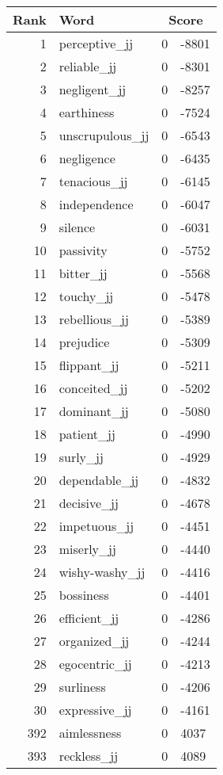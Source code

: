 \begin{longtable}[!htbp]{| rlr@{.}l |}
    \hline
    \textbf{Rank} & \textbf{Word} & \multicolumn{2}{c|}{\textbf{Score}} \\
    \hline
    \endhead
    1 & perceptive\_jj & 0 & -8801 \\
    2 & reliable\_jj & 0 & -8301 \\
    3 & negligent\_jj & 0 & -8257 \\
    4 & earthiness & 0 & -7524 \\
    5 & unscrupulous\_jj & 0 & -6543 \\
    6 & negligence & 0 & -6435 \\
    7 & tenacious\_jj & 0 & -6145 \\
    8 & independence & 0 & -6047 \\
    9 & silence & 0 & -6031 \\
    10 & passivity & 0 & -5752 \\
    11 & bitter\_jj & 0 & -5568 \\
    12 & touchy\_jj & 0 & -5478 \\
    13 & rebellious\_jj & 0 & -5389 \\
    14 & prejudice & 0 & -5309 \\
    15 & flippant\_jj & 0 & -5211 \\
    16 & conceited\_jj & 0 & -5202 \\
    17 & dominant\_jj & 0 & -5080 \\
    18 & patient\_jj & 0 & -4990 \\
    19 & surly\_jj & 0 & -4929 \\
    20 & dependable\_jj & 0 & -4832 \\
    21 & decisive\_jj & 0 & -4678 \\
    22 & impetuous\_jj & 0 & -4451 \\
    23 & miserly\_jj & 0 & -4440 \\
    24 & wishy-washy\_jj & 0 & -4416 \\
    25 & bossiness & 0 & -4401 \\
    26 & efficient\_jj & 0 & -4286 \\
    27 & organized\_jj & 0 & -4244 \\
    28 & egocentric\_jj & 0 & -4213 \\
    29 & surliness & 0 & -4206 \\
    30 & expressive\_jj & 0 & -4161 \\
    392 & aimlessness & 0 & 4037 \\
    393 & reckless\_jj & 0 & 4089 \\

\end{longtable}
